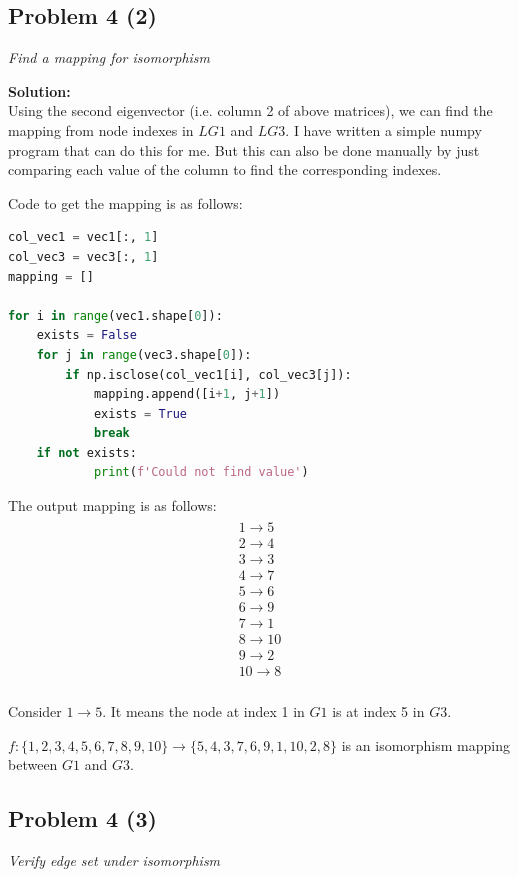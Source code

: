 \documentclass[12pt,a4paper]{article}
\newcommand{\solution}{\noindent\textbf{Solution:}\\}
\begin{document}
\newpage
\subsection*{Problem 4 (2)}
\textit{
    Find a mapping for isomorphism
}

\solution
Using the second eigenvector (i.e. column 2 of above matrices), we can find the mapping from node indexes in $LG1$ and $LG3$. I have written a simple numpy program that can do this for me. But this can also be done manually by just comparing each value of the column to find the corresponding indexes.

Code to get the mapping is as follows:
\begin{lstlisting}[language=python]
col_vec1 = vec1[:, 1]
col_vec3 = vec3[:, 1]
mapping = []

for i in range(vec1.shape[0]):
    exists = False
    for j in range(vec3.shape[0]):
        if np.isclose(col_vec1[i], col_vec3[j]):
            mapping.append([i+1, j+1])
            exists = True
            break
    if not exists:
            print(f'Could not find value')
\end{lstlisting}

The output mapping is as follows:
\begin{align}
    \begin{matrix}
        1 \rightarrow 5 \\
        2 \rightarrow 4 \\
        3 \rightarrow 3 \\
        4 \rightarrow 7 \\
        5 \rightarrow 6 \\
        6 \rightarrow 9 \\
        7 \rightarrow 1 \\
        8 \rightarrow 10 \\
        9 \rightarrow 2 \\
        10 \rightarrow 8 \\
    \end{matrix}
\end{align}

Consider $1 \rightarrow 5$. It means the node at index 1 in $G1$ is at index 5 in $G3$.

$f: \{1,2,3,4,5,6,7,8,9,10\} \rightarrow \{5,4,3,7,6,9,1,10,2,8\}$ is an isomorphism mapping between $G1$ and $G3$.

\newpage
\subsection*{Problem 4 (3)}
\textit{
    Verify edge set under isomorphism
}
\end{document}
